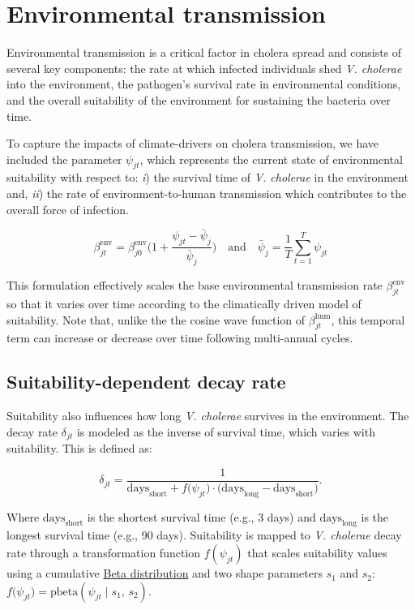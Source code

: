 \documentclass[
]{book}
\begin{document}
\section{Environmental transmission}\label{environmental-transmission}

Environmental transmission is a critical factor in cholera spread and consists of several key components: the rate at which infected individuals shed \emph{V. cholerae} into the environment, the pathogen's survival rate in environmental conditions, and the overall suitability of the environment for sustaining the bacteria over time.

To capture the impacts of climate-drivers on cholera transmission, we have included the parameter \(\psi_{jt}\), which represents the current state of environmental suitability with respect to: \emph{i}) the survival time of \emph{V. cholerae} in the environment and, \emph{ii}) the rate of environment-to-human transmission which contributes to the overall force of infection.

\begin{equation}
\beta_{jt}^{\text{env}} = \beta_{j0}^{\text{env}} \Bigg(1 + \frac{\psi_{jt}-\bar\psi_j}{\bar\psi_j} \Bigg) \quad \text{and} \quad \bar\psi_j = \frac{1}{T} \sum_{t=1}^{T} \psi_{jt}
\label{eq:beta2}
\end{equation}

This formulation effectively scales the base environmental transmission rate \(\beta_{jt}^{\text{env}}\) so that it varies over time according to the climatically driven model of suitability. Note that, unlike the the cosine wave function of \(\beta_{jt}^{\text{hum}}\), this temporal term can increase or decrease over time following multi-annual cycles.

\subsection{Suitability-dependent decay rate}\label{suitability-dependent-decay-rate}

Suitability also influences how long \emph{V. cholerae} survives in the environment. The decay rate \(\delta_{jt}\) is modeled as the inverse of survival time, which varies with suitability. This is defined as:

\[
\delta_{jt} = \frac{1}{\text{days}_{\text{short}} + f\big(\psi_{jt}\big) \cdot \big(\text{days}_{\text{long}} - \text{days}_{\text{short}}\big)}.
\label{eq:delta}
\]

Where \(\text{days}_{\text{short}}\) is the shortest survival time (e.g., 3 days) and \(\text{days}_{\text{long}}\) is the longest survival time (e.g., 90 days). Suitability is mapped to \emph{V. cholerae} decay rate through a transformation function \(f(\psi_{jt})\) that scales suitability values using a cumulative \href{https://en.wikipedia.org/wiki/Beta_distribution}{Beta distribution} and two shape parameters \(s_1\) and \(s_2\): \(f\big(\psi_{jt}\big) = \text{pbeta}(\psi_{jt} \mid s_1, \, s_2)\).
\end{document}
